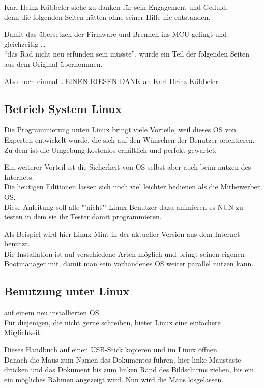 Karl-Heinz Kübbeler siehe \cite{karlheinz1} zu danken für sein Engagement und Geduld,\\
denn die folgenden Seiten hätten ohne seiner Hilfe nie entstanden.
     
Damit das übersetzen der Firmware und Brennen ins MCU gelingt und gleichzeitig \dots \\
"`das Rad nicht neu erfunden sein müsste"', wurde ein Teil der folgenden Seiten aus dem
Original übernommen.

Also noch einmal \dots \huge{EINEN RIESEN DANK}
\normalsize an Karl-Heinz Kübbeler.

\subsection{Betrieb System Linux}

Die Programmierung unten Linux bringt viele Vorteile, weil dieses OS von Experten entwickelt wurde, die sich auf den Wünschen der Benutzer orientieren.
Zu dem ist die Umgebung kostenlos erhältlich und perfekt gewartet.

Ein weiterer Vorteil ist die Sicherheit von OS selbst aber auch beim nutzen des Internets.\\ 
Die heutigen Editionen lassen sich noch viel leichter bedienen als die Mitbewerber OS.\\
Diese Anleitung soll alle "'nicht"' Linux Benutzer dazu animieren es NUN zu testen in dem sie ihr Tester damit programmieren.

Als Beispiel wird hier Linux Mint in der aktueller Version aus dem Internet benutzt.
\\Die Installation ist auf verschiedene Arten möglich und bringt seinen eigenen Bootmanager mit, damit man sein vorhandenes OS weiter parallel nutzen kann.

\subsection{Benutzung unter Linux}

auf einem neu installierten OS.\\
Für diejenigen, die nicht gerne schreiben, bietet Linux eine einfachere Möglichkeit:

Dieses Handbuch auf einen USB-Stick kopieren und im Linux öffnen.\\
Danach die Maus zum Namen des Dokumentes führen, hier linke Maustaste drücken und das Dokument bis zum linken Rand des Bildschirms ziehen, bis ein ein mögliches Rahmen angezeigt wird.
Nun wird die Maus losgelassen.


